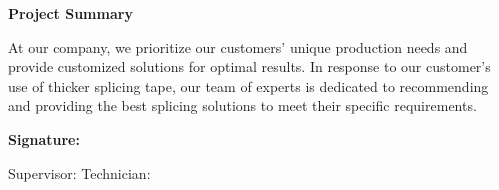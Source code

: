 \documentclass{article}
\begin{document}
\vspace{1em}

\begin{center}
    \textbf{Project Summary}
\end{center}

\vspace{1em}
At our company, we prioritize our customers' unique production needs and provide customized solutions for optimal results. In response to our customer's use of thicker splicing tape, our team of experts is dedicated to recommending and providing the best splicing solutions to meet their specific requirements.

\vspace{1cm}

\noindent \textbf{Signature:}

\vspace{0.5cm}

\noindent Supervisor: \underline{\hspace{5cm}}\hfill Technician: \underline{\hspace{5cm}}
\end{document}
